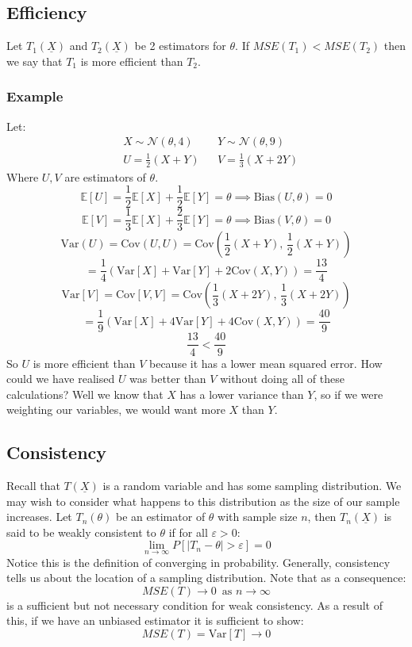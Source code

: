 \documentclass[12pt]{article}
\begin{document}
\subsection{Efficiency}
Let \(T_1(\underline{X})\) and \(T_2(\underline{X})\) be 2 estimators for \(\theta\). If \(MSE(T_1)<MSE(T_2)\) then we say that \(T_1\) is more efficient than \(T_2\).
\subsubsection*{Example}
Let:
\begin{align*}
    &X\sim\mathcal{N}(\theta,4) && Y\sim\mathcal{N}(\theta,9) \\
    &U=\frac{1}{2}(X+Y) && V=\frac{1}{3}(X+2Y)
\end{align*}
Where \(U,V\) are estimators of \(\theta\).
\[\mathbb{E}[U]=\frac{1}{2}\mathbb{E}[X]+\frac{1}{2}\mathbb{E}[Y]=\theta\implies \text{Bias}(U,\theta)=0\]
\[\mathbb{E}[V]=\frac{1}{3}\mathbb{E}[X]+\frac{2}{3}\mathbb{E}[Y]=\theta\implies \text{Bias}(V,\theta)=0\]
\[\text{Var}(U)=\text{Cov}(U,U)=\text{Cov}\left(\frac{1}{2}(X+Y),\,\frac{1}{2}(X+Y)\right)\]
\[=\frac{1}{4}(\text{Var}[X]+\text{Var}[Y]+2\text{Cov}(X,Y))=\frac{13}{4}\]
\[\text{Var}[V]=\text{Cov}[V,V]=\text{Cov}\left(\frac{1}{3}(X+2Y),\, \frac{1}{3}(X+2Y)\right)\]
\[=\frac{1}{9}(\text{Var}[X]+4\text{Var}[Y]+4\text{Cov}(X,Y))=\frac{40}{9}\]
\[\frac{13}{4}<\frac{40}{9}\]
So \(U\) is more efficient than \(V\) because it has a lower mean squared error. How could we have realised \(U\) was better than \(V\) without doing all of these calculations? Well we know that \(X\) has a lower variance than \(Y\), so if we were weighting our variables, we would want more \(X\) than \(Y\).
\subsection{Consistency}
Recall that \(T(\underline{X})\) is a random variable and has some sampling distribution. We may wish to consider what happens to this distribution as the size of our sample increases. Let \(T_n(\theta)\) be an estimator of \(\theta\) with sample size \(n\), then \(T_n(\underline{X})\) is said to be weakly consistent to \(\theta\) if for all \(\varepsilon>0\):
\[\lim_{n\to\infty}P[|T_n-\theta|>\varepsilon]=0\]
Notice this is the definition of converging in probability. Generally, consistency tells us about the location of a sampling distribution. Note that as a consequence:
\[MSE(T)\to 0\,\text{ as }n\to\infty\]
is a sufficient but not necessary condition for weak consistency. As a result of this, if we have an unbiased estimator it is sufficient to show:
\[MSE(T)=\text{Var}[T]\to 0\]
\clearpage
\end{document}

